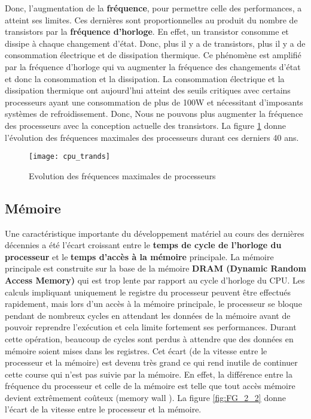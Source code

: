 Donc, l’augmentation de la \textbf{fréquence}, pour permettre celle des performances, a atteint ses limites. 
Ces dernières sont proportionnelles au produit du nombre de transistors par la \textbf{fréquence d’horloge}. 
En effet, un transistor consomme et dissipe à chaque changement d’état. 
Donc, plus il y a de transistors, plus il y a de consommation électrique et de dissipation thermique. 
Ce phénomène est amplifié par la fréquence d’horloge qui va augmenter la fréquence des changements d’état et donc la consommation et la dissipation. 
La consommation électrique et la dissipation thermique ont aujourd’hui atteint des seuils critiques avec certains processeurs ayant  une consommation de plus de 100W et nécessitant d’imposants systèmes de refroidissement.
Donc, Nous ne pouvons plus augmenter la fréquence des processeurs avec la conception actuelle des transistors. La figure \ref{fig:FG_2_1} donne l'évolution des fréquences maximales des processeurs durant ces derniers 40 ans.

\begin{figure}[h]
\texttt{[image: cpu\_trands]}
\centering
\caption{Evolution des fréquences maximales de processeurs \cite{qaca17}}
\label{fig:FG_2_1}
\end{figure}
%
\subsection{Mémoire}
%
Une caractéristique importante du développement matériel au cours des dernières décennies a été l'écart croissant entre le \textbf{temps de cycle de l'horloge du processeur} et le \textbf{temps d'accès à la mémoire} principale. 
La mémoire principale est construite sur la base de la mémoire \textbf{DRAM (Dynamic Random Access Memory)} qui est trop lente par rapport au cycle d'horloge du CPU.
Les calculs impliquant uniquement le registre du processeur peuvent être effectués rapidement, mais lors d'un accès à la mémoire principale, le processeur se bloque pendant de nombreux cycles en attendant les données de la mémoire avant de pouvoir reprendre l'exécution et cela limite fortement ses performances. Durant cette opération, beaucoup de cycles sont perdus à attendre que des données en mémoire soient mises dans les registres.
Cet écart (de la vitesse entre le processeur et la mémoire) est devenu très grand ce qui rend inutile de continuer cette course qui n'est pas suivie par la mémoire.
En effet, la différence entre la fréquence du processeur et celle de la mémoire est telle que tout accès mémoire devient extrêmement coûteux (memory wall \cite{memw04}).
La figure \ref{fig:FG_2_2} donne l'écart de la vitesse entre le processeur et la mémoire.

